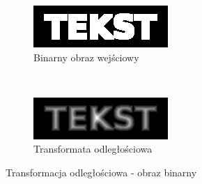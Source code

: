 \begin{figure}
  \centering
  \begin{subfigure}[b]{0.45\textwidth}
    \includegraphics[width=\textwidth]{img/distance-transform-before}
    \caption{Binarny obraz wejściowy}
    \label{fig:distance_transform_before}
  \end{subfigure}
  ~
  \begin{subfigure}[b]{0.45\textwidth}
    \includegraphics[width=\textwidth]{img/distance-transform-after}
    \caption{Transformata odległościowa}
    \label{fig:distance_transform_after}
  \end{subfigure}
    \caption{Transformacja odległościowa - obraz binarny}
    \label{fig:distance_transform}
\end{figure}

